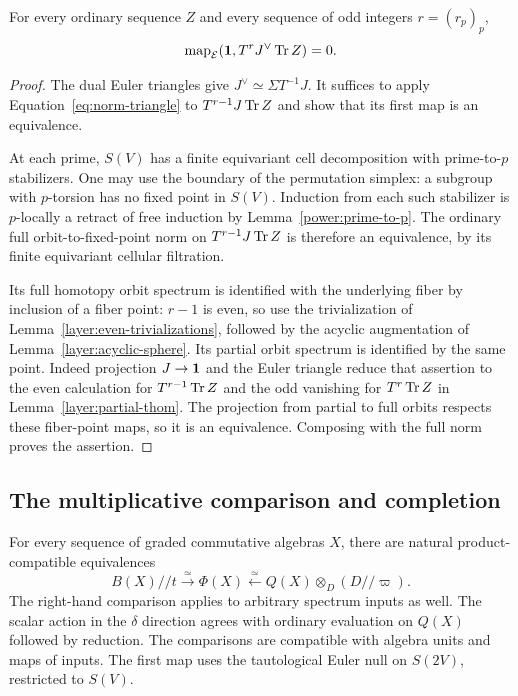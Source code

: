 \begin{lemma}
\label{layer:odd-vanishing}
For every ordinary sequence $Z$ and every sequence of odd integers
$r=(r_p)_p$,
\[
 \operatorname{map}_{\mathcal E}(\mathbf 1,T^rJ^\vee\operatorname{Tr} Z)=0.
\]
\end{lemma}

\begin{proof}
The dual Euler triangles give
$J^\vee\simeq\Sigma T^{-1}J$. It suffices to apply
Equation~\eqref{eq:norm-triangle} to $T^{r-1}J\operatorname{Tr} Z$ and show that
its first map is an equivalence.

At each prime, $S(V)$ has a finite equivariant cell decomposition
with prime-to-$p$ stabilizers. One may use the boundary of the
permutation simplex: a subgroup with $p$-torsion has no fixed point
in $S(V)$. Induction from each such stabilizer is $p$-locally a
retract of free induction by Lemma~\ref{power:prime-to-p}. The
ordinary full orbit-to-fixed-point norm on
$T^{r-1}J\operatorname{Tr} Z$ is therefore an equivalence, by its finite
equivariant cellular filtration.

Its full homotopy orbit spectrum is identified with the underlying
fiber by inclusion of a fiber point: $r-1$ is even, so use the
trivialization of Lemma~\ref{layer:even-trivializations}, followed
by the acyclic augmentation of
Lemma~\ref{layer:acyclic-sphere}. Its partial orbit spectrum is
identified by the same point. Indeed projection $J\to\mathbf 1$ and
the Euler triangle reduce that assertion to the even calculation
for $T^{r-1}\operatorname{Tr} Z$ and the odd vanishing for $T^r\operatorname{Tr} Z$ in
Lemma~\ref{layer:partial-thom}. The projection from partial to
full orbits respects these fiber-point maps, so it is an
equivalence. Composing with the full norm proves the assertion.
\end{proof}

\subsection{The multiplicative comparison and completion}

\begin{proposition}
\label{layer:comparison}
For every sequence of graded commutative algebras $X$, there are
natural product-compatible equivalences
\begin{equation}
 \label{eq:layer}
 B(X)//t\xrightarrow{\simeq}\Phi(X)
 \xleftarrow{\simeq}Q(X)\otimes_D(D//\varpi).
\end{equation}
The right-hand comparison applies to arbitrary spectrum inputs as
well. The scalar action in the $\delta$ direction agrees with
ordinary evaluation on $Q(X)$ followed by reduction. The
comparisons are compatible with algebra units and maps of inputs.
The first map uses the tautological Euler null on $S(2V)$, restricted
to $S(V)$.
\end{proposition}

